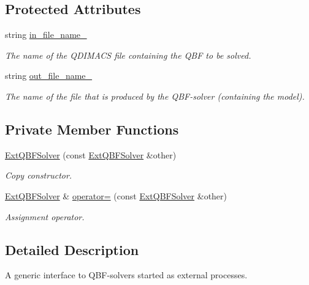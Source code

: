 \subsection*{Protected Attributes}
\begin{DoxyCompactItemize}
\item 
string \hyperlink{classExtQBFSolver_a04d2ff483c22a11344e46d66ae7e76b1}{in\-\_\-file\-\_\-name\-\_\-}
\begin{DoxyCompactList}\small\item\em The name of the Q\-D\-I\-M\-A\-C\-S file containing the Q\-B\-F to be solved. \end{DoxyCompactList}\item 
string \hyperlink{classExtQBFSolver_a0efb35aa9b807dec521ad3406eaf664d}{out\-\_\-file\-\_\-name\-\_\-}
\begin{DoxyCompactList}\small\item\em The name of the file that is produced by the Q\-B\-F-\/solver (containing the model). \end{DoxyCompactList}\end{DoxyCompactItemize}
\subsection*{Private Member Functions}
\begin{DoxyCompactItemize}
\item 
\hyperlink{classExtQBFSolver_a8ae0e96c56f9e2db776e67ba319d2536}{Ext\-Q\-B\-F\-Solver} (const \hyperlink{classExtQBFSolver}{Ext\-Q\-B\-F\-Solver} \&other)
\begin{DoxyCompactList}\small\item\em Copy constructor. \end{DoxyCompactList}\item 
\hyperlink{classExtQBFSolver}{Ext\-Q\-B\-F\-Solver} \& \hyperlink{classExtQBFSolver_ae0d0f2a04590eec266f65f64ec7e243c}{operator=} (const \hyperlink{classExtQBFSolver}{Ext\-Q\-B\-F\-Solver} \&other)
\begin{DoxyCompactList}\small\item\em Assignment operator. \end{DoxyCompactList}\end{DoxyCompactItemize}


\subsection{Detailed Description}
A generic interface to Q\-B\-F-\/solvers started as external processes. 

